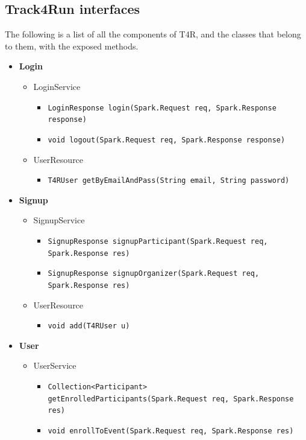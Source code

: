 \documentclass[a4paper, hidelinks, 12pt]{report}
\begin{document}
	\subsection{Track4Run interfaces}
	The following is a list of all the components of T4R, and the classes that belong to them, with the exposed methods.
	\begin{itemize}
		\item{\textbf{Login}}
			\begin{itemize}
				\item{LoginService}
					\begin{itemize}
						\item{\verb|LoginResponse login(Spark.Request req, Spark.Response response)|}
						\item{\verb|void logout(Spark.Request req, Spark.Response response)|}
					\end{itemize}
				\item{UserResource}
					\begin{itemize}
						\item{\verb|T4RUser getByEmailAndPass(String email, String password)|}
					\end{itemize}
			\end{itemize}
		\item{\textbf{Signup}}
			\begin{itemize}
				\item{SignupService}
					\begin{itemize}
						\item{\verb|SignupResponse signupParticipant(Spark.Request req, Spark.Response res)|}
						\item{\verb|SignupResponse signupOrganizer(Spark.Request req, Spark.Response res)|}
					\end{itemize}
				\item{UserResource}
					\begin{itemize}
						\item{\verb|void add(T4RUser u)|}
					\end{itemize}
			\end{itemize}
		\item{\textbf{User}}
			\begin{itemize}
				\item{UserService}
					\begin{itemize}
						\item{\verb|Collection<Participant> getEnrolledParticipants(Spark.Request req, Spark.Response res)|}
						\item{\verb|void enrollToEvent(Spark.Request req, Spark.Response res)|}

\end{itemize}
\end{itemize}
\end{itemize}
\end{document}
